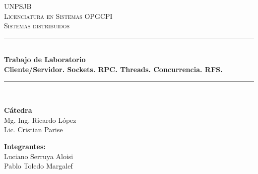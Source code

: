 \begin{titlepage}

    \newcommand{\HRule}{\rule{\linewidth}{0.5mm}} %

    \center %
     

    \textsc{\LARGE UNPSJB}\\[1cm] %
    \textsc{\Large Licenciatura en Sistemas OPGCPI}\\[0.5cm] %
    \textsc{\large Sistemas distribuidos}\\[0.5cm] %


    \HRule \\[0.4cm]
    {\huge \bfseries Trabajo de Laboratorio}\\[0.4cm] %
    {\large \bfseries Cliente/Servidor. Sockets. RPC. Threads. Concurrencia. RFS.}\\[0.4cm] %
    \HRule \\[1.5cm]
     


    \begin{minipage}[l]{0.5\textwidth}
        \begin{flushleft}
            \textbf{\textsf{Cátedra}}\\
            \large Mg. Ing. Ricardo López\\ 
            \large Lic. Cristian Parise\\ 
            \linespread{4}
            \end{flushleft}
    \end{minipage}
    \begin{minipage}[l]{0.4\textwidth}
        \begin{flushright}
            \textbf{\textsf{Integrantes:}}\\
            \linespread{1}
            \large Luciano Serruya Aloisi\\
            \large Pablo Toledo Margalef\\
        \end{flushright}
    \end{minipage}\\[1.5cm]


\end{titlepage}
